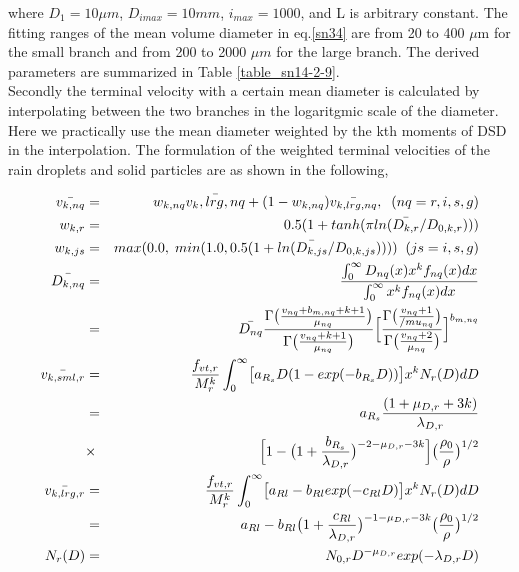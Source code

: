 where $D_{1}=10\mu m$, $D_{imax}=10mm$, $i_{max}=1000$, and L is arbitrary constant. The fitting ranges of the mean volume diameter in eq.\ref{sn34} are from 20 to 400 $\mu$m for the small branch and from 200 to 2000 $\mu m$ for the large branch. The derived parameters are summarized in Table \ref{table_sn14-2-9}.\\
Secondly the terminal velocity with a certain mean diameter is calculated by interpolating between the two branches in the logaritgmic scale of the diameter. Here we practically use the mean diameter weighted by the kth moments of DSD in the interpolation. The formulation of the weighted terminal velocities of the rain droplets and solid particles are as shown in the following,

\begin{eqnarray}
\bar{v_{k,nq}}&=&w_{k,nq}\bar{v_k,lrg,nq}+(1-w_{k,nq})\bar{v_{k,lrg,nq}},\;\;(nq=r,i,s,g)\label{sn36}\\
w_{k,r}&=&0.5(1+tanh(\pi ln(\bar{D_{k,r}}/D_{0,k,r})))\nonumber\\
w_{k,js}&=&max(0.0, \;min(1.0,0.5(1+ln(\bar{D_{k,js}}/D_{0,k,js}))))\;\;(js=i,s,g)\nonumber\\
\bar{D_{k,nq}}&=&\frac{\int_{0}^{\infty}D_{nq}(x)x^{k}f_{nq}(x)dx}{\int_{0}^{\infty}x^{k}f_{nq}(x)dx}\nonumber\\
              &=&\bar{D_{nq}}\frac{\Gamma\bigl(\frac{v_{nq}+b_{m,nq}+k+1}{\mu_{nq}}\bigr)}{\Gamma\bigl(\frac{v_{nq}+k+1}{\mu_{nq}}\bigr)}\Bigl[\frac{\Gamma\bigl(\frac{v_{nq}+1}{/mu_{nq}}\bigr)}{\Gamma\bigl(\frac{v_{nq}+2}{\mu_{nq}}\bigr)}\Bigr]^{b_{m,nq}}\label{sn37}\\
\bar{v_{k,sml,r}}&=&\frac{f_{vt,r}}{M_{r}^{k}}\int_{0}^{\infty}\bigl[a_{R_{s}}D(1-exp(-b_{R_{s}}D))\bigr]x^{k}N_{r}(D)dD\nonumber\\
&=&a_{R_{s}}\frac{(1+\mu_{D,r}+3k)}{\lambda_{D,r}}\nonumber\\
&\times&\Bigl[1-\bigl(1+\frac{b_{R_{s}}}{\lambda_{D,r}}\bigr)^{-2-\mu_{D,r}-3k}\Bigr]\bigl(\frac{\rho_{0}}{\rho}\bigr)^{1/2}\label{sn38}\\
\bar{v_{k,lrg,r}}&=&\frac{f_{vt,r}}{M_{r}^{k}}\int_{0}^{\infty}\bigl[a_{Rl}-b_{Rl}exp(-c_{Rl}D)\bigr]x^{k}N_{r}(D)dD\nonumber\\
&=&a_{Rl}-b_{Rl}\bigl(1+\frac{c_{Rl}}{\lambda_{D,r}}\bigr)^{-1-\mu_{D,r}-3k}\bigl(\frac{\rho_{0}}{\rho}\bigr)^{1/2}\label{sn39}\\
N_{r}(D)&=&N_{0,r}D^{-\mu_{D,r}}exp(-\lambda_{D,r}D)
\end{eqnarray}

